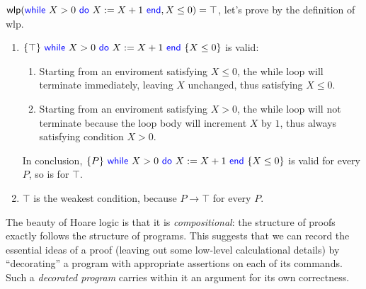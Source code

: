 \documentclass[11pt,a4paper]{article}
\newcommand{\kword}[1]{{\color{blue} \textsf{#1}}}
\newcommand{\While}{\kword{while}}
\newcommand{\Do}{\kword{do}}
\newcommand{\End}{\kword{end}}
\newcommand{\wlp}[2]{\textsf{wlp}(#1, #2)}
\begin{document}
\begin{solution}
  $\wlp{\While~X > 0~\Do~X := X + 1~\End}{X \le 0} = \top$, let's prove by the definition of $\text{wlp}$.
  
  \begin{enumerate}
    \item $\{\top\}~\While~X > 0~\Do~X := X + 1~\End~\{X \le 0\}$ is valid:
      \begin{enumerate}
        \item Starting from an enviroment satisfying $X \le 0$, the while loop will terminate immediately, leaving $X$ unchanged, thus satisfying $X \le 0$.
        \item Starting from an enviroment satisfying $X > 0$, the while loop will not terminate because the loop body will increment $X$ by $1$, thus always satisfying condition $X > 0$.
      \end{enumerate}
      In conclusion, $\{P\}~\While~X > 0~\Do~X := X + 1~\End~\{X \le 0\}$ is valid for every $P$, so is for $\top$.
    \item $\top$ is the weakest condition, because $P \rightarrow \top$ for every $P$.
  \end{enumerate}
\end{solution}

\newpage
{}

The beauty of Hoare logic is that it is \emph{compositional}:
the structure of proofs exactly follows the structure of programs.
This suggests that we can record the essential ideas of a proof (leaving out some low-level calculational details)
by ``decorating'' a program with appropriate assertions on each of its commands.
Such a \emph{decorated program} carries within it an argument for its own correctness.
\end{document}
